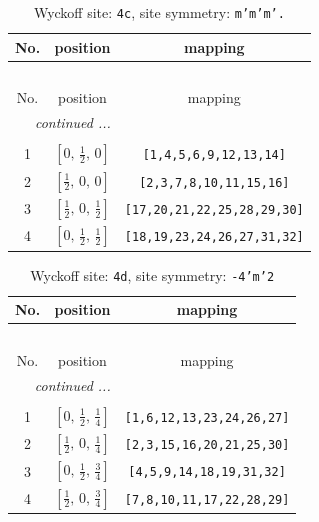\documentclass[fleqn,8pt]{jsarticle}
\begin{document}
\renewcommand{\arraystretch}{1.2}
\begin{longtable}{ccc}
\caption{Wyckoff site: {\tt 4c}, site symmetry: {\tt m'm'm'.}}
 \\
 \hline \hline
No. & position & mapping \\ \hline \endfirsthead

\multicolumn{2}{l}{\tablename\ \thetable{}} \\
 \hline \hline
No. & position & mapping \\ \hline \endhead

 \hline \hline
\multicolumn{2}{r}{\footnotesize\it continued ...} \\ \endfoot

 \hline \hline
\multicolumn{2}{r}{} \\ \endlastfoot

1 & $\left[ 0,\, \frac{1}{2},\, 0 \right]$ & {\tt [1,4,5,6,9,12,13,14]} \\ \hline
2 & $\left[ \frac{1}{2},\, 0,\, 0 \right]$ & {\tt [2,3,7,8,10,11,15,16]} \\ \hline
3 & $\left[ \frac{1}{2},\, 0,\, \frac{1}{2} \right]$ & {\tt [17,20,21,22,25,28,29,30]} \\ \hline
4 & $\left[ 0,\, \frac{1}{2},\, \frac{1}{2} \right]$ & {\tt [18,19,23,24,26,27,31,32]} \\
\end{longtable}
\renewcommand{\arraystretch}{1.2}
\begin{longtable}{ccc}
\caption{Wyckoff site: {\tt 4d}, site symmetry: {\tt -4'm'2}}
 \\
 \hline \hline
No. & position & mapping \\ \hline \endfirsthead

\multicolumn{2}{l}{\tablename\ \thetable{}} \\
 \hline \hline
No. & position & mapping \\ \hline \endhead

 \hline \hline
\multicolumn{2}{r}{\footnotesize\it continued ...} \\ \endfoot

 \hline \hline
\multicolumn{2}{r}{} \\ \endlastfoot

1 & $\left[ 0,\, \frac{1}{2},\, \frac{1}{4} \right]$ & {\tt [1,6,12,13,23,24,26,27]} \\ \hline
2 & $\left[ \frac{1}{2},\, 0,\, \frac{1}{4} \right]$ & {\tt [2,3,15,16,20,21,25,30]} \\ \hline
3 & $\left[ 0,\, \frac{1}{2},\, \frac{3}{4} \right]$ & {\tt [4,5,9,14,18,19,31,32]} \\ \hline
4 & $\left[ \frac{1}{2},\, 0,\, \frac{3}{4} \right]$ & {\tt [7,8,10,11,17,22,28,29]} \\
\end{longtable}
\end{document}

